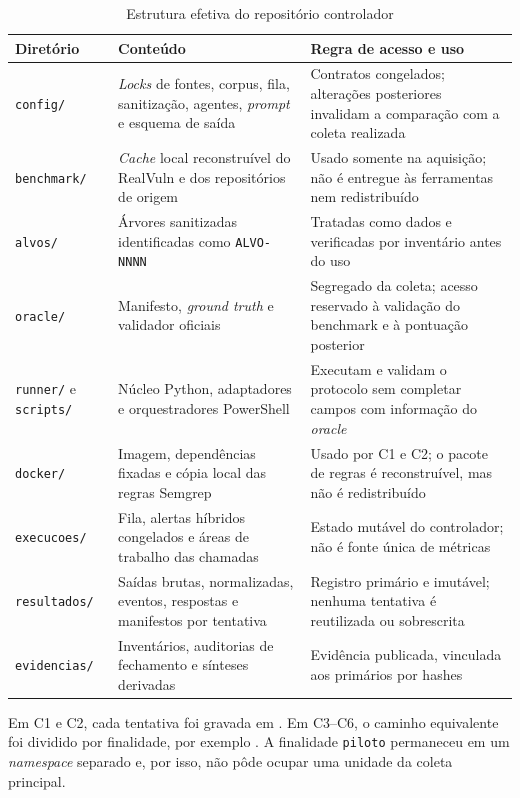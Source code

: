 \begin{table}[htb]
\ABNTEXfontereduzida
\caption{Estrutura efetiva do repositório controlador}
\label{tab:estrutura-repositorio-experimental}
\centering
\begin{tabularx}{\textwidth}{|l|X|X|}
\hline
\textbf{Diretório} & \textbf{Conteúdo} & \textbf{Regra de acesso e uso} \\
\hline
\texttt{config/} & \textit{Locks} de fontes, corpus, fila, sanitização, agentes, \textit{prompt} e esquema de saída & Contratos congelados; alterações posteriores invalidam a comparação com a coleta realizada \\
\hline
\texttt{benchmark/} & \textit{Cache} local reconstruível do RealVuln e dos repositórios de origem & Usado somente na aquisição; não é entregue às ferramentas nem redistribuído \\
\hline
\texttt{alvos/} & Árvores sanitizadas identificadas como \texttt{ALVO-NNNN} & Tratadas como dados e verificadas por inventário antes do uso \\
\hline
\texttt{oracle/} & Manifesto, \textit{ground truth} e validador oficiais & Segregado da coleta; acesso reservado à validação do benchmark e à pontuação posterior \\
\hline
\texttt{runner/} e \texttt{scripts/} & Núcleo Python, adaptadores e orquestradores PowerShell & Executam e validam o protocolo sem completar campos com informação do \textit{oracle} \\
\hline
\texttt{docker/} & Imagem, dependências fixadas e cópia local das regras Semgrep & Usado por C1 e C2; o pacote de regras é reconstruível, mas não é redistribuído \\
\hline
\texttt{execucoes/} & Fila, alertas híbridos congelados e áreas de trabalho das chamadas & Estado mutável do controlador; não é fonte única de métricas \\
\hline
\texttt{resultados/} & Saídas brutas, normalizadas, eventos, respostas e manifestos por tentativa & Registro primário e imutável; nenhuma tentativa é reutilizada ou sobrescrita \\
\hline
\texttt{evidencias/} & Inventários, auditorias de fechamento e sínteses derivadas & Evidência publicada, vinculada aos primários por hashes \\
\hline
\end{tabularx}
\end{table}

Em C1 e C2, cada tentativa foi gravada em . Em C3--C6, o caminho equivalente foi dividido por finalidade, por exemplo . A finalidade \texttt{piloto} permaneceu em um \textit{namespace} separado e, por isso, não pôde ocupar uma unidade da coleta principal.

